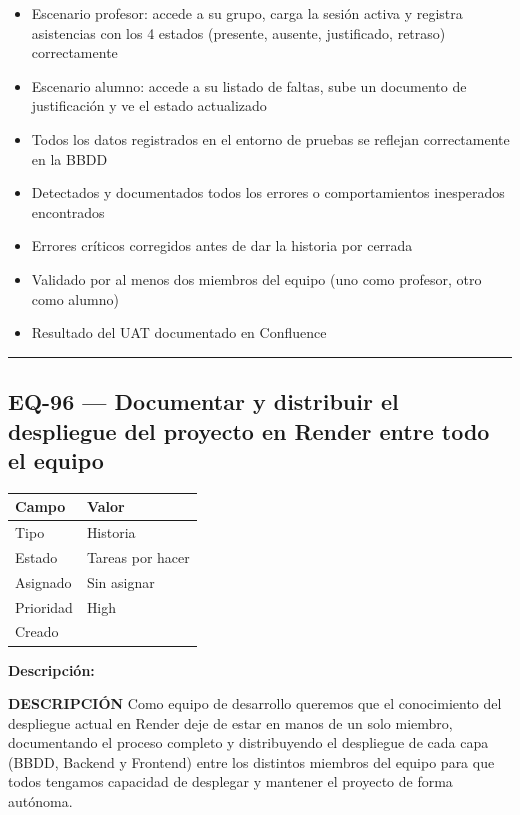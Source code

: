\documentclass[
  spanish,
  11pt,
]{report}
\newcounter{none} %
\providecommand{\tightlist}{%
  \setlength{\itemsep}{0pt}\setlength{\parskip}{0pt}}
\begin{document}
\begin{itemize}
\tightlist
\item
  Escenario profesor: accede a su grupo, carga la sesión activa y
  registra asistencias con los 4 estados (presente, ausente,
  justificado, retraso) correctamente
\item
  Escenario alumno: accede a su listado de faltas, sube un documento de
  justificación y ve el estado actualizado
\item
  Todos los datos registrados en el entorno de pruebas se reflejan
  correctamente en la BBDD
\item
  Detectados y documentados todos los errores o comportamientos
  inesperados encontrados
\item
  Errores críticos corregidos antes de dar la historia por cerrada
\item
  Validado por al menos dos miembros del equipo (uno como profesor, otro
  como alumno)
\item
  Resultado del UAT documentado en Confluence
\end{itemize}

\begin{center}\rule{0.5\linewidth}{0.5pt}\end{center}

\subsection{EQ-96 --- Documentar y distribuir el despliegue del proyecto
en Render entre todo el
equipo}\label{eq-96-documentar-y-distribuir-el-despliegue-del-proyecto-en-render-entre-todo-el-equipo}

{\def\LTcaptype{none} %
\begin{longtable}[]{@{}ll@{}}
\toprule\noalign{}
Campo & Valor \\
\midrule\noalign{}
\endhead
\bottomrule\noalign{}
\endlastfoot
Tipo & Historia \\
Estado & Tareas por hacer \\
Asignado & Sin asignar \\
Prioridad & High \\
Creado & \\
\end{longtable}
}

\textbf{Descripción:}

\textbf{DESCRIPCIÓN} Como equipo de desarrollo queremos que el
conocimiento del despliegue actual en Render deje de estar en manos de
un solo miembro, documentando el proceso completo y distribuyendo el
despliegue de cada capa (BBDD, Backend y Frontend) entre los distintos
miembros del equipo para que todos tengamos capacidad de desplegar y
mantener el proyecto de forma autónoma.
\end{document}
